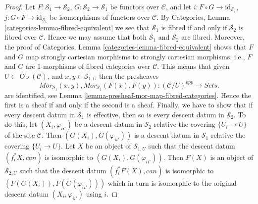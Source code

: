 \documentclass{stacks-project}
\theoremstyle{plain}
\theoremstyle{definition}
\theoremstyle{remark}
\numberwithin{equation}{subsection}
\def\Ob{\mathop{\mathrm{Ob}}\nolimits}
\begin{document}
\begin{proof}
Let $F : \mathcal{S}_1 \to \mathcal{S}_2$,
$G : \mathcal{S}_2 \to \mathcal{S}_1$ be functors over $\mathcal{C}$, and let
$i : F \circ G \to \text{id}_{\mathcal{S}_2}$,
$j : G \circ F \to \text{id}_{\mathcal{S}_1}$ be isomorphisms of
functors over $\mathcal{C}$. By
Categories, Lemma \ref{categories-lemma-fibred-equivalent}
we see that $\mathcal{S}_1$ is fibred if and only if $\mathcal{S}_2$
is fibred over $\mathcal{C}$. Hence we may assume that both
$\mathcal{S}_1$ and $\mathcal{S}_2$ are fibred. Moreover, the proof of
Categories, Lemma \ref{categories-lemma-fibred-equivalent}
shows that $F$ and $G$ map strongly cartesian morphisms to strongly
cartesian morphisms, i.e., $F$ and $G$ are $1$-morphisms of fibred
categories over $\mathcal{C}$. This means that given
$U \in \Ob(\mathcal{C})$, and $x, y \in \mathcal{S}_{1, U}$ then
the presheaves
$$
\mathit{Mor}_{\mathcal{S}_1}(x, y),
\mathit{Mor}_{\mathcal{S}_1}(F(x), F(y)) :
(\mathcal{C}/U)^{opp} \longrightarrow \textit{Sets}.
$$
are identified, see
Lemma \ref{lemma-presheaf-mor-map-fibred-categories}. Hence
the first is a sheaf if and only if the second is a sheaf.
Finally, we have to show that if every descent datum in $\mathcal{S}_1$
is effective, then so is every descent datum in $\mathcal{S}_2$.
To do this, let $(X_i, \varphi_{ii'})$ be a descent datum
in $\mathcal{S}_2$ relative the covering $\{U_i \to U\}$ of the site
$\mathcal{C}$. Then $(G(X_i), G(\varphi_{ii'}))$ is a descent datum
in $\mathcal{S}_1$ relative the covering $\{U_i \to U\}$.
Let $X$ be an object of $\mathcal{S}_{1, U}$ such that the
descent datum $(f_i^*X, can)$ is isomorphic to
$(G(X_i), G(\varphi_{ii'}))$. Then $F(X)$ is an object of $\mathcal{S}_{2, U}$
such that the descent datum $(f_i^*F(X), can)$ is isomorphic to
$(F(G(X_i)), F(G(\varphi_{ii'})))$ which in turn is isomorphic to
the original descent datum $(X_i, \varphi_{ii'})$ using $i$.
\end{proof}
\end{document}

